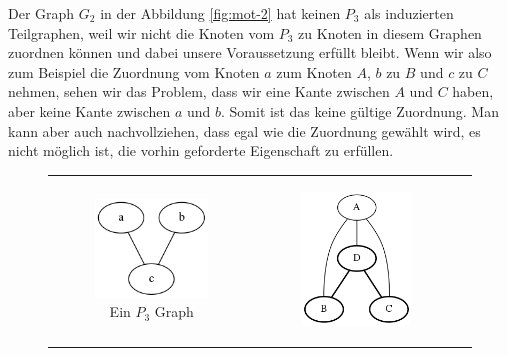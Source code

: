 \documentclass[12pt,a4paper,onecolumn,oneside,titlepage]{article}
\begin{document}
Der Graph $G_2$ in der Abbildung \ref{fig:mot-2} hat keinen $P_3$ als induzierten Teilgraphen, weil wir nicht die Knoten vom $P_3$ zu Knoten in diesem Graphen zuordnen können und dabei unsere Voraussetzung erfüllt bleibt. Wenn wir also zum Beispiel die Zuordnung vom Knoten $a$ zum Knoten $A$, $b$ zu $B$ und $c$ zu $C$ nehmen, sehen wir das Problem, dass wir eine Kante zwischen $A$ und $C$ haben, aber keine Kante zwischen $a$ und $b$. Somit ist das keine gültige Zuordnung. Man kann aber auch nachvollziehen, dass egal wie die Zuordnung gewählt wird, es nicht möglich ist, die vorhin geforderte Eigenschaft zu erfüllen.

\begin{figure}
  \centering
 
  \begin{tabular}[c]{ccc}
    \begin{subfigure}[b]{0.32\textwidth}
      \includegraphics[scale=0.6]{dot/dot_mot_p3.png}
   
      \caption{Ein $P_3$ Graph }
      \label{fig:mot-p3}
   \end{subfigure}&
	 \begin{subfigure}[b]{0.32\textwidth}
	 \includegraphics[scale=0.5]{dot/dot_mot_1.png}
	 

\end{subfigure}
\end{tabular}
\end{figure}
\end{document}
